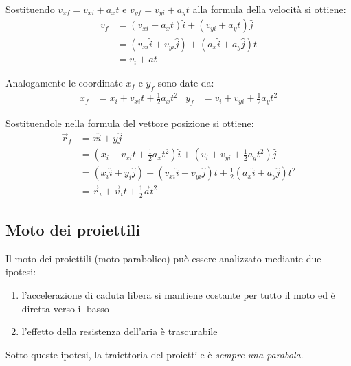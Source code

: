\documentclass[a4paper,11pt,oneside]{book}
\begin{document}
\noindent Sostituendo $v_{xf} = v_{xi} + a_x t$ e $v_{yf} = v_{yi} + a_y t$ alla formula della velocità si ottiene:
\begin{align*}
    v_f & = (v_{xi} + a_x t)\hat{i} + (v_{yi} + a_y t)\hat{j}            \\
        & = (v_{xi}\hat{i} + v_{yi}\hat{j}) + (a_x\hat{i} + a_y\hat{j})t \\
        & = v_i + at
\end{align*}

\noindent Analogamente le coordinate $x_f$ e $y_f$ sono date da:
\begin{align*}
    x_f & = x_i + v_{xi}t + \frac{1}{2}a_xt^2 & y_f & = v_i + v_{yi} + \frac{1}{2}a_yt^2
\end{align*}

\noindent Sostituendole nella formula del vettore posizione si ottiene:
\begin{align*}
    \vec{r}_f & = x\hat{i} + y\hat{j}                                                                                            \\
              & = (x_i + v_{xi}t + \frac{1}{2}a_xt^2)\hat{i} + (v_i + v_{yi} + \frac{1}{2}a_yt^2)\hat{j}                         \\
              & = (x_i \hat{i} + y_i \hat{j}) + (v_{xi} \hat{i} + v_{yi} \hat{j})t + \frac{1}{2} (a_x \hat{i} + a_y \hat{j}) t^2 \\
              & = \vec{r}_i + \vec{v}_i t + \frac{1}{2} \vec{a} t^2
\end{align*}

\subsection{Moto dei proiettili}
Il moto dei proiettili (moto parabolico) può essere analizzato mediante due ipotesi:
\begin{enumerate}
    \item l’accelerazione di caduta libera si mantiene costante per tutto il moto ed è diretta verso il basso
    \item l’effetto della resistenza dell’aria è trascurabile
\end{enumerate}
Sotto queste ipotesi, la traiettoria del proiettile è \emph{sempre una parabola}.
\end{document}
